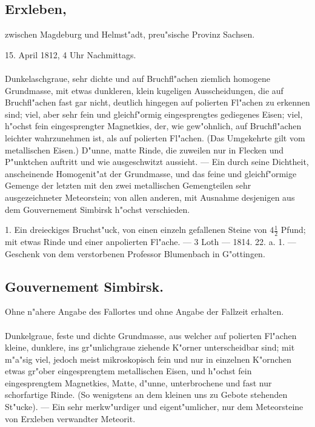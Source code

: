 \documentclass[a4paper, 11pt, oneside, polutonikogreek, german]{article}
\begin{document}
\subsection[Erxleben.]{Erxleben,}
\begin{center}
\small
zwischen Magdeburg und Helmst"adt, preu"sische Provinz Sachsen.

15. April 1812, 4 Uhr Nachmittags.
\end{center}
\paragraph{}
Dunkelaschgraue, sehr dichte und auf Bruchfl"achen ziemlich homogene Grundmasse, mit etwas dunkleren, klein kugeligen Ausscheidungen, die auf Bruchfl"achen fast gar nicht, deutlich hingegen auf polierten Fl"achen zu erkennen sind; viel, aber sehr fein und gleichf"ormig eingesprengtes gediegenes Eisen; viel, h"ochst fein eingesprengter Magnetkies, der, wie gew"ohnlich, auf Bruchfl"achen leichter wahrzunehmen ist, als auf polierten Fl"achen. (Das Umgekehrte gilt vom metallischen Eisen.) D"unne, matte Rinde, die zuweilen nur in Flecken und P"unktchen auftritt und wie ausgeschwitzt aussieht. --- Ein durch seine Dichtheit, anscheinende Homogenit"at der Grundmasse, und das feine und gleichf"ormige Gemenge der letzten mit den zwei metallischen Gemengteilen sehr ausgezeichneter Meteorstein; von allen anderen, mit Ausnahme desjenigen aus dem Gouvernement Simbirsk h"ochst verschieden.

1. Ein dreieckiges Bruchst"uck, von einen einzeln gefallenen Steine von $4\frac{1}{2}$ Pfund; mit etwas Rinde und einer anpolierten Fl"ache. --- 3 Loth --- 1814. 22. a. 1. --- Geschenk von dem verstorbenen Professor Blumenbach in G"ottingen.
\subsection{Gouvernement Simbirsk.}
\begin{center}
\small
Ohne n"ahere Angabe des Fallortes und ohne Angabe der Fallzeit erhalten.
\end{center}
\paragraph{}
Dunkelgraue, feste und dichte Grundmasse, aus welcher auf polierten Fl"achen kleine, dunklere, ins gr"unlichgraue ziehende K"orner unterscheidbar sind; mit m"a"sig viel, jedoch meist mikroskopisch fein und nur in einzelnen K"ornchen etwas gr"ober eingesprengtem metallischen Eisen, und h"ochst fein eingesprengtem Magnetkies, Matte, d"unne, unterbrochene und fast nur schorfartige Rinde. (So wenigstens an dem kleinen uns zu Gebote stehenden St"ucke). --- Ein sehr merkw"urdiger und eigent"umlicher, nur dem Meteorsteine von Erxleben verwandter Meteorit.
\end{document}
